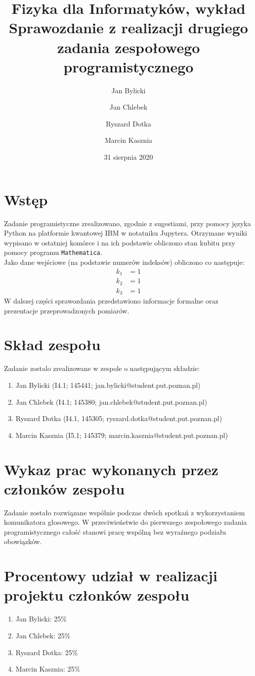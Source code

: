 \documentclass{article}
\title{Fizyka dla Informatyków, wykład\\ Sprawozdanie z realizacji drugiego zadania zespołowego programistycznego}
\author{Jan Bylicki \and Jan Chlebek \and Ryszard Dotka \and Marcin Kasznia}
\date{31 sierpnia 2020}
\begin{document}
\maketitle

\section{Wstęp}
Zadanie programistyczne zrealizowano, zgodnie z sugestiami, przy pomocy języka Python na platformie kwantowej IBM w notatniku Jupytera. Otrzymane wyniki wypisano w ostatniej komórce i na ich podstawie obliczono stan kubitu przy pomocy programu \verb+Mathematica+.\\
Jako dane wejściowe (na podstawie numerów indeksów) obliczono co następuje:
\begin{align*}
    k_1&=1\\
    k_2&=1\\
    k_3&=1
\end{align*}
W dalszej części sprawozdania przedstawiono informacje formalne oraz prezentacje przeprowadzonych pomiarów.

\section{Skład zespołu}
Zadanie zostalo zrealizowane w zespole o następującym składzie:
\begin{enumerate}
    \item Jan Bylicki (I4.1; 145441; jan.bylicki@student.put.poznan.pl)
    \item Jan Chlebek (I4.1; 145380; jan.chlebek@student.put.poznan.pl)
    \item Ryszard Dotka (I4.1, 145305; ryszard.dotka@student.put.poznan.pl)
    \item Marcin Kasznia (I5.1; 145379; marcin.kasznia@student.put.poznan.pl)
\end{enumerate}

\section{Wykaz prac wykonanych przez członków zespołu}
    Zadanie zostało rozwiązane wspólnie podczas dwóch spotkań z wykorzystaniem komunikatora głosowego. W przeciwieństwie do pierwszego zespołowego zadania programistycznego całość stanowi pracę wspólną bez wyraźnego podziału obowiązków.
    

\section{Procentowy udział w realizacji projektu członków zespołu}
\begin{enumerate}
    \item Jan Bylicki: 25\%
    \item Jan Chlebek: 25\%
    \item Ryszard Dotka: 25\%
    \item Marcin Kasznia: 25\%
\end{enumerate}
\end{document}
